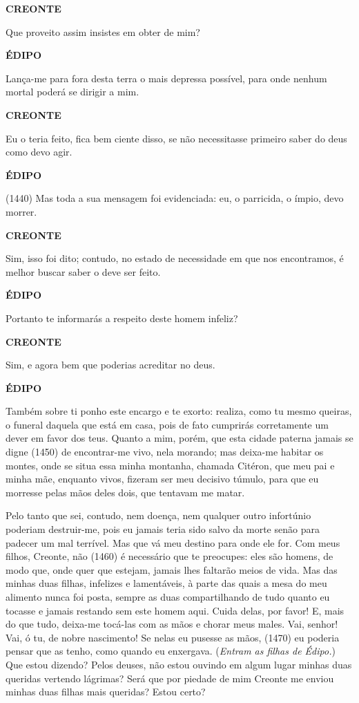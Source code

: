 \textbf{CREONTE}

Que proveito assim insistes em obter de mim?

\textbf{ÉDIPO}

Lança-me para fora desta terra o mais depressa possível, para onde
nenhum mortal poderá se dirigir a mim.

\textbf{CREONTE}

Eu o teria feito, fica bem ciente disso, se não necessitasse primeiro
saber do deus como devo agir.

\textbf{ÉDIPO}

(1440) Mas toda a sua mensagem foi evidenciada: eu, o parricida, o
ímpio, devo morrer.

\textbf{CREONTE }

Sim, isso foi dito; contudo, no estado de necessidade em que nos
encontramos, é melhor buscar saber o deve ser feito.

\textbf{ÉDIPO}

Portanto te informarás a respeito deste homem infeliz?

\textbf{CREONTE}

Sim, e agora bem que poderias acreditar no deus.

\textbf{ÉDIPO}

Também sobre ti ponho este encargo e te exorto: realiza, como tu mesmo
queiras, o funeral daquela que está em casa, pois de fato cumprirás
corretamente um dever em favor dos teus. Quanto a mim, porém, que esta
cidade paterna jamais se digne (1450) de encontrar-me vivo, nela
morando; mas deixa-me habitar os montes, onde se situa essa minha
montanha, chamada Citéron, que meu pai e minha mãe, enquanto vivos,
fizeram ser meu decisivo túmulo, para que eu morresse pelas mãos deles
dois, que tentavam me matar.

Pelo tanto que sei, contudo, nem doença, nem qualquer outro infortúnio
poderiam destruir-me, pois eu jamais teria sido salvo da morte senão
para padecer um mal terrível. Mas que vá meu destino para onde ele for.
Com meus filhos, Creonte, não (1460) é necessário que te preocupes: eles
são homens, de modo que, onde quer que estejam, jamais lhes faltarão
meios de vida. Mas das minhas duas filhas, infelizes e lamentáveis, à
parte das quais a mesa do meu alimento nunca foi posta, sempre as duas
compartilhando de tudo quanto eu tocasse e jamais restando sem este
homem aqui. Cuida delas, por favor! E, mais do que tudo, deixa-me
tocá-las com as mãos e chorar meus males. Vai, senhor! Vai, ó tu, de
nobre nascimento! Se nelas eu pusesse as mãos, (1470) eu poderia pensar
que as tenho, como quando eu enxergava. (\emph{Entram as filhas de
Édipo.}) Que estou dizendo? Pelos deuses, não estou ouvindo em algum
lugar minhas duas queridas vertendo lágrimas? Será que por piedade de
mim Creonte me enviou minhas duas filhas mais queridas? Estou certo?

